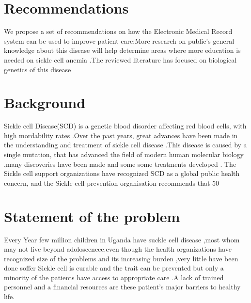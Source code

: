 \documentclass[12pt,]{article}
\begin{document}
\section{Recommendations}
We propose a set of recommendations on how the Electronic Medical Record system can be used to improve patient care:More research on public’s general knowledge about this disease will help determine areas where more education is needed on sickle cell anemia .The reviewed literature has focused on biological genetics of this disease



\section{Background}
Sickle cell Disease(SCD) is a genetic blood disorder affecting red blood cells, with high mordability rates .Over the past years, great advances have been made in the understanding and treatment of sickle cell disease .This disease is caused by a single mutation, that has advanced the field of modern human molecular biology ,many discoveries have been made and some some treatments developed . The Sickle cell support organizations have recognized SCD as a global public health concern, and the Sickle cell prevention organisation recommends that 50%


\section{Statement of the problem}
Every Year few million children in Uganda have suckle cell disease ,most whom may not live beyond adoloscenece.even though the health organizations have  recognized size of the problems and its increasing burden ,very little have been done soffer Sickle cell is curable and the trait can be prevented but only a minority of the patients have access to appropriate care .A lack of trained personnel and a financial resources are these patient’s major barriers to healthy life.
\end{document}
